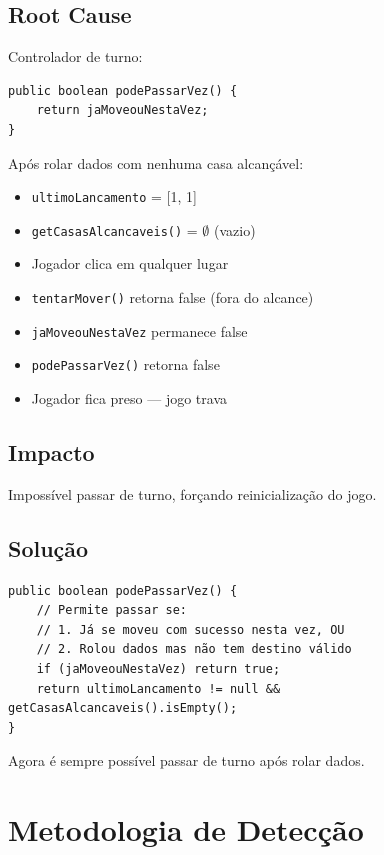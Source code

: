 \documentclass[12pt,a4paper]{report}
\begin{document}
\subsection{Root Cause}

Controlador de turno:
\begin{lstlisting}
public boolean podePassarVez() {
    return jaMoveouNestaVez;
}
\end{lstlisting}

Após rolar dados com nenhuma casa alcançável:
\begin{itemize}
    \item \texttt{ultimoLancamento} = [1, 1]
    \item \texttt{getCasasAlcancaveis()} = $\emptyset$ (vazio)
    \item Jogador clica em qualquer lugar
    \item \texttt{tentarMover()} retorna false (fora do alcance)
    \item \texttt{jaMoveouNestaVez} permanece false
    \item \texttt{podePassarVez()} retorna false
    \item Jogador fica preso --- jogo trava
\end{itemize}

\subsection{Impacto}

Impossível passar de turno, forçando reinicialização do jogo.

\subsection{Solução}

\begin{lstlisting}
public boolean podePassarVez() {
    // Permite passar se:
    // 1. Já se moveu com sucesso nesta vez, OU
    // 2. Rolou dados mas não tem destino válido
    if (jaMoveouNestaVez) return true;
    return ultimoLancamento != null && getCasasAlcancaveis().isEmpty();
}
\end{lstlisting}

Agora é sempre possível passar de turno após rolar dados.

\section{Metodologia de Detecção}
\end{document}
